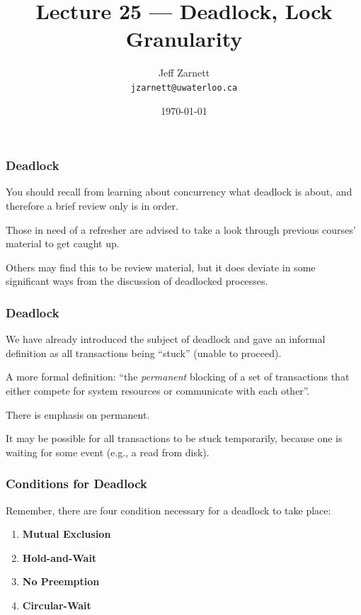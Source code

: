 

\title{Lecture 25 --- Deadlock, Lock Granularity}

\author{Jeff Zarnett \\ \small \texttt{jzarnett@uwaterloo.ca}}
\date{\today}




\begin{frame}
  \titlepage

 \end{frame}

\begin{frame}
\frametitle{Deadlock}

You should recall from learning about concurrency what deadlock is about, and therefore a brief review only is in order. 

Those in need of a refresher are advised to take a look through previous courses' material to get caught up. 

Others may find this to be review material, but it does deviate in some significant ways from the discussion of deadlocked processes.

\end{frame}

\begin{frame}
\frametitle{Deadlock}
We have already introduced the subject of deadlock and gave an informal definition as all transactions being ``stuck'' (unable to proceed). 

A more formal definition: ``the \textit{permanent} blocking of a set of transactions that either compete for system resources or communicate with each other''. 

There is emphasis on permanent. 

It may be possible for all transactions to be stuck temporarily, because one is waiting for some event (e.g., a read from disk).

\end{frame}

\begin{frame}
\frametitle{Conditions for Deadlock}
Remember, there are four condition necessary for a deadlock to take place:

\begin{enumerate}
	\item \textbf{Mutual Exclusion}
	\item \textbf{Hold-and-Wait}
	\item \textbf{No Preemption}
	\item \textbf{Circular-Wait}
\end{enumerate}

\end{frame}

